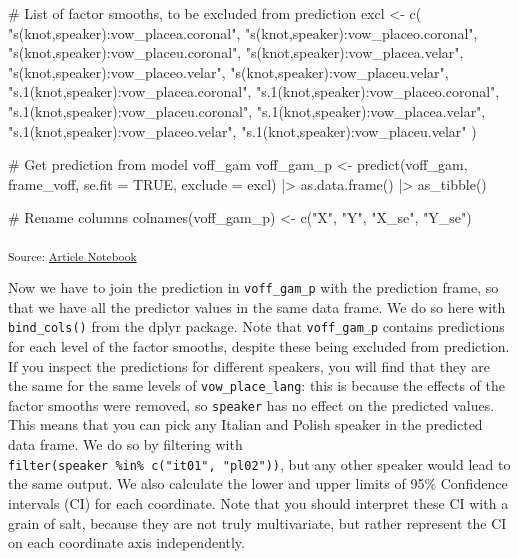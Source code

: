 \documentclass[
]{interact}
\newenvironment{Shaded}{\begin{snugshade}}{\end{snugshade}}
\newcommand{\AttributeTok}[1]{\textcolor[rgb]{0.40,0.45,0.13}{#1}}
\newcommand{\CommentTok}[1]{\textcolor[rgb]{0.37,0.37,0.37}{#1}}
\newcommand{\ConstantTok}[1]{\textcolor[rgb]{0.56,0.35,0.01}{#1}}
\newcommand{\FunctionTok}[1]{\textcolor[rgb]{0.28,0.35,0.67}{#1}}
\newcommand{\NormalTok}[1]{\textcolor[rgb]{0.00,0.23,0.31}{#1}}
\newcommand{\OtherTok}[1]{\textcolor[rgb]{0.00,0.23,0.31}{#1}}
\newcommand{\SpecialCharTok}[1]{\textcolor[rgb]{0.37,0.37,0.37}{#1}}
\newcommand{\StringTok}[1]{\textcolor[rgb]{0.13,0.47,0.30}{#1}}
\begin{document}
\begin{Shaded}
\begin{Highlighting}[]
\CommentTok{\# List of factor smooths, to be excluded from prediction}
\NormalTok{excl }\OtherTok{\textless{}{-}} \FunctionTok{c}\NormalTok{(}
  \StringTok{"s(knot,speaker):vow\_placea.coronal"}\NormalTok{,}
  \StringTok{"s(knot,speaker):vow\_placeo.coronal"}\NormalTok{,}
  \StringTok{"s(knot,speaker):vow\_placeu.coronal"}\NormalTok{,}
  \StringTok{"s(knot,speaker):vow\_placea.velar"}\NormalTok{,}
  \StringTok{"s(knot,speaker):vow\_placeo.velar"}\NormalTok{,}
  \StringTok{"s(knot,speaker):vow\_placeu.velar"}\NormalTok{,}
  \StringTok{"s.1(knot,speaker):vow\_placea.coronal"}\NormalTok{,}
  \StringTok{"s.1(knot,speaker):vow\_placeo.coronal"}\NormalTok{,}
  \StringTok{"s.1(knot,speaker):vow\_placeu.coronal"}\NormalTok{,}
  \StringTok{"s.1(knot,speaker):vow\_placea.velar"}\NormalTok{,}
  \StringTok{"s.1(knot,speaker):vow\_placeo.velar"}\NormalTok{,}
  \StringTok{"s.1(knot,speaker):vow\_placeu.velar"}
\NormalTok{)}

\CommentTok{\# Get prediction from model voff\_gam}
\NormalTok{voff\_gam\_p }\OtherTok{\textless{}{-}} \FunctionTok{predict}\NormalTok{(voff\_gam, frame\_voff, }\AttributeTok{se.fit =} \ConstantTok{TRUE}\NormalTok{, }\AttributeTok{exclude =}\NormalTok{ excl) }\SpecialCharTok{|\textgreater{}}
  \FunctionTok{as.data.frame}\NormalTok{() }\SpecialCharTok{|\textgreater{}}
  \FunctionTok{as\_tibble}\NormalTok{()}

\CommentTok{\# Rename columns}
\FunctionTok{colnames}\NormalTok{(voff\_gam\_p) }\OtherTok{\textless{}{-}} \FunctionTok{c}\NormalTok{(}\StringTok{"X"}\NormalTok{, }\StringTok{"Y"}\NormalTok{, }\StringTok{"X\_se"}\NormalTok{, }\StringTok{"Y\_se"}\NormalTok{)}
\end{Highlighting}
\end{Shaded}

\textsubscript{Source:
\href{https://stefanocoretta.github.io/mv_uti/index.qmd.html}{Article
Notebook}}

Now we have to join the prediction in \texttt{voff\_gam\_p} with the
prediction frame, so that we have all the predictor values in the same
data frame. We do so here with \texttt{bind\_cols()} from the dplyr
package. Note that \texttt{voff\_gam\_p} contains predictions for each
level of the factor smooths, despite these being excluded from
prediction. If you inspect the predictions for different speakers, you
will find that they are the same for the same levels of
\texttt{vow\_place\_lang}: this is because the effects of the factor
smooths were removed, so \texttt{speaker} has no effect on the predicted
values. This means that you can pick any Italian and Polish speaker in
the predicted data frame. We do so by filtering with
\texttt{filter(speaker\ \%in\%\ c("it01",\ "pl02"))}, but any other
speaker would lead to the same output. We also calculate the lower and
upper limits of 95\% Confidence intervals (CI) for each coordinate. Note
that you should interpret these CI with a grain of salt, because they
are not truly multivariate, but rather represent the CI on each
coordinate axis independently.
\end{document}
